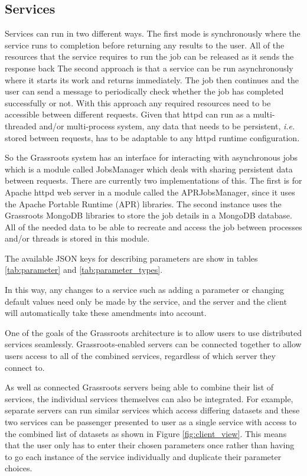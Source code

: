 \documentclass[9pt,a4paper]{extarticle}
\begin{document}
\subsection*{Services}

Services can run in two different ways. The first mode is synchronously where the service runs to completion before returning any results to the user. All of the resources that the service requires to run the job can be released as it sends the response back
The second approach is that a service can be run asynchronously where it starts its work and returns immediately. The job then continues and the user can send a message to periodically check whether the job has completed successfully or not. With this approach any required resources need to be accessible between different requests. Given that httpd can  run as a multi-threaded and/or multi-process system, any data that needs to be persistent, \textit{i.e.} stored between requests, has to be adaptable to any httpd runtime configuration.

So the Grassroots system has an interface for interacting with asynchronous jobs which is a module called JobsManager which deals with sharing persistent data between requests. There are currently two implementations of this. The first is for Apache httpd web server in a module called the APRJobsManager, since it uses the Apache Portable Runtime (APR) libraries. The second instance uses the Grassroots MongoDB libraries to store the job details in a MongoDB database.
All of the needed data to be able to recreate and access the job between processes and/or threads is stored in this module.

The available JSON keys for describing parameters are show in tables \ref{tab:parameter} and \ref{tab:parameter_types}.


In this way, any changes to a service such as adding a parameter or changing default values need only be made by the service, and the server and the client will automatically take these amendments into account.

One of the goals of the Grassroots architecture is to allow users to use distributed services seamlessly.
Grassroots-enabled servers can be connected together to allow users access to all of the combined services, regardless of which server they connect to. 

As well as connected Grassroots servers being able to combine their list of services, the individual services themselves can also be integrated. 
For example, separate servers can run similar services which access differing datasets and these two services can be passenger presented to user as a single service with access to the combined list of datasets as shown in Figure \ref{fig:client_view}. 
This means that the user only has to enter their chosen parameters once rather than having to go each instance of the service individually and duplicate their parameter choices. 
\end{document}

